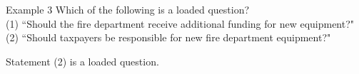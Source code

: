 \documentclass[t]{beamer}
\begin{document}
\begin{frame}{Example 3}
Which of the following is a loaded question?	\newline\\
(1) \quad ``Should the fire department receive additional funding for new equipment?"	\newline\\
(2) \quad ``Should taxpayers be responsible for new fire department equipment?"			\newline\\ \pause

Statement (2) is a loaded question.
\end{frame}
\end{document}
